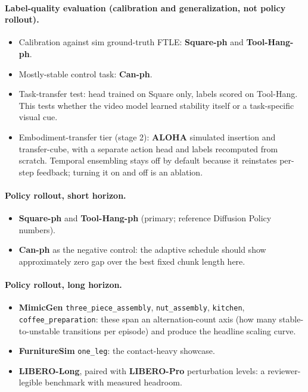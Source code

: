 \documentclass[11pt]{article}
\begin{document}
\paragraph{Label-quality evaluation (calibration and generalization, not policy rollout).}
\begin{itemize}[leftmargin=2em]
  \item Calibration against sim ground-truth FTLE: \textbf{Square-ph} and
        \textbf{Tool-Hang-ph}.
  \item Mostly-stable control task: \textbf{Can-ph}.
  \item Task-transfer test: head trained on Square only, labels scored on Tool-Hang.
        This tests whether the video model learned stability itself or a
        task-specific visual cue.
  \item Embodiment-transfer tier (stage 2): \textbf{ALOHA} simulated insertion and
        transfer-cube, with a separate action head and labels recomputed from
        scratch. Temporal ensembling stays off by default because it reinstates
        per-step feedback; turning it on and off is an ablation.
\end{itemize}

\paragraph{Policy rollout, short horizon.}
\begin{itemize}[leftmargin=2em]
  \item \textbf{Square-ph} and \textbf{Tool-Hang-ph} (primary; reference Diffusion
        Policy numbers).
  \item \textbf{Can-ph} as the negative control: the adaptive schedule should show
        approximately zero gap over the best fixed chunk length here.
\end{itemize}

\paragraph{Policy rollout, long horizon.}
\begin{itemize}[leftmargin=2em]
  \item \textbf{MimicGen} \texttt{three\_piece\_assembly}, \texttt{nut\_assembly},
        \texttt{kitchen}, \texttt{coffee\_preparation}: these span an
        alternation-count axis (how many stable-to-unstable transitions per episode)
        and produce the headline scaling curve.
  \item \textbf{FurnitureSim} \texttt{one\_leg}: the contact-heavy showcase.
  \item \textbf{LIBERO-Long}, paired with \textbf{LIBERO-Pro} perturbation levels: a
        reviewer-legible benchmark with measured headroom.
\end{itemize}
\end{document}

